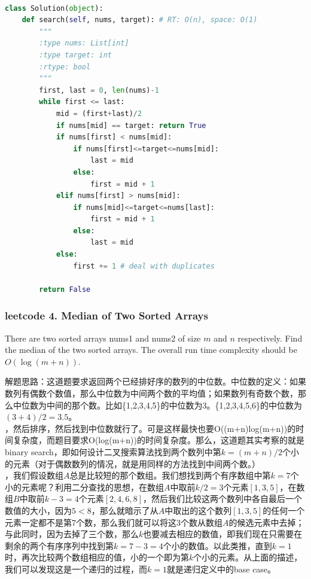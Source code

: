 \documentclass[a4paper,10pt]{article}
\begin{document}
\begin{lstlisting}[language=Python, caption=Problem81. Search in Rotated Sorted Array II]

class Solution(object):
    def search(self, nums, target): # RT: O(n), space: O(1)
        """
        :type nums: List[int]
        :type target: int
        :rtype: bool
        """
        first, last = 0, len(nums)-1
        while first <= last:
            mid = (first+last)/2
            if nums[mid] == target: return True
            if nums[first] < nums[mid]:
                if nums[first]<=target<=nums[mid]:
                    last = mid
                else:
                    first = mid + 1
            elif nums[first] > nums[mid]:
                if nums[mid]<=target<=nums[last]:
                    first = mid + 1
                else:
                    last = mid
            else:
                first += 1 # deal with duplicates
                
        return False
\end{lstlisting}


\subsubsection{leetcode 4. Median of Two Sorted Arrays}

There are two sorted arrays nums1 and nums2 of size $m$ and $n$ respectively. Find the median of the two sorted arrays. The overall run time complexity should be $O(\log (m+n))$.\\

\begin{CJK*}{UTF8}{gbsn}
\noindent 解题思路：这道题要求返回两个已经排好序的数列的中位数。中位数的定义：如果数列有偶数个数值，那么中位数为中间两个数的平均值；如果数列有奇数个数，那么中位数为中间的那个数。比如\{1,2,3,4,5\}的中位数为3。\{1,2,3,4,5,6\}的中位数为$(3+4)/2 = 3.5$。\\

，然后排序，然后找到中位数就行了。可是这样最快也要O((m+n)log(m+n))的时间复杂度，而题目要求O(log(m+n))的时间复杂度。那么，这道题其实考察的就是binary search，即如何设计二叉搜索算法找到两个数列中第$k=(m+n)/2$个小的元素（对于偶数数列的情况，就是用同样的方法找到中间两个数。）\\

，我们假设数组$A$总是比较短的那个数组。我们想找到两个有序数组中第$k=7$个小的元素呢？利用二分查找的思想，在数组$A$中取前$k/2=3$个元素$[1,3,5]$，在数组$B$中取前$k-3=4$个元素$[2,4,6,8]$，然后我们比较这两个数列中各自最后一个数值的大小，因为$5<8$，那么就暗示了从$A$中取出的这个数列$[1,3,5]$的任何一个元素一定都不是第7个数，那么我们就可以将这3个数从数组$A$的候选元素中去掉；与此同时，因为去掉了三个数，那么$k$也要减去相应的数值，即我们现在只需要在剩余的两个有序序列中找到第$k=7-3=4$个小的数值。以此类推，直到$k=1$时，再次比较两个数组相应的值，小的一个即为第$k$个小的元素。从上面的描述，我们可以发现这是一个递归的过程，而$k=1$就是递归定义中的base case。
\end{CJK*}
\end{document}

